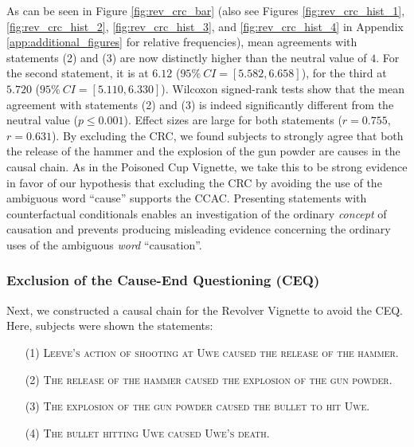 \documentclass[egregdoesnotlikesansseriftitles,12pt]{scrartcl}
\begin{document}
\noindent As can be seen in Figure \ref{fig:rev_crc_bar} (also see Figures \ref{fig:rev_crc_hist_1}, \ref{fig:rev_crc_hist_2}, \ref{fig:rev_crc_hist_3}, and \ref{fig:rev_crc_hist_4} in Appendix \ref{app:additional_figures} for relative frequencies), mean agreements with statements (2) and (3) are now distinctly higher than the neutral value of $4$. For the second statement, it is at $6.12$ ($95\%~CI=[5.582,6.658]$), for the third at $5.720$ ($95\%~CI=[5.110,6.330]$). Wilcoxon signed-rank tests show that the mean agreement with statements (2) and (3) is indeed significantly different from the neutral value ($p \leq 0.001$). Effect sizes are large for both statements ($r=0.755$, $r=0.631$). By excluding the CRC, we found subjects to strongly agree that both the release of the hammer and the explosion of the gun powder are causes in the causal chain. As in the Poisoned Cup Vignette, we take this to be strong evidence in favor of our hypothesis that excluding the CRC by avoiding the use of the ambiguous word ``cause'' supports the CCAC. Presenting statements with counterfactual conditionals enables an investigation of the ordinary \textit{concept} of causation and prevents producing misleading evidence concerning the ordinary uses of the ambiguous \textit{word} ``causation''.

\subsubsection{Exclusion of the Cause-End Questioning (CEQ)}\label{sec:results_rev_ceq}
Next, we constructed a causal chain for the Revolver Vignette to avoid the CEQ. Here, subjects were shown the statements:

\begin{itemize}
   \item[(1)]\textsc{Leeve's action of shooting at Uwe caused the release of the hammer.}
   \item[(2)]\textsc{The release of the hammer caused the explosion of the gun powder.}
   \item[(3)]\textsc{The explosion of the gun powder caused the bullet to hit Uwe.}
   \item[(4)]\textsc{The bullet hitting Uwe caused Uwe's death.}
\end{itemize}
\end{document}
